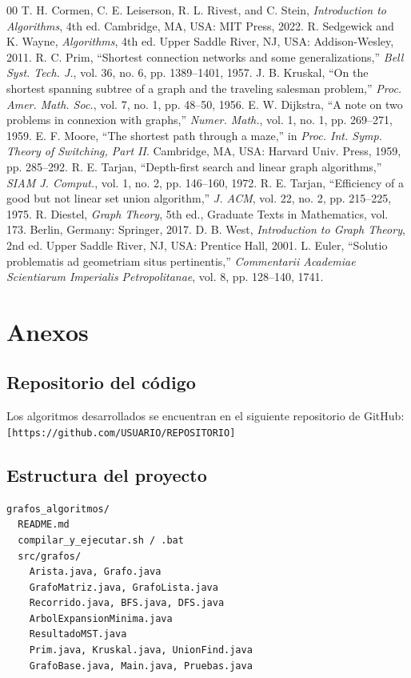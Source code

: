 \documentclass[conference]{IEEEtran}
\begin{document}
\begin{thebibliography}{00}
 T. H. Cormen, C. E. Leiserson, R. L. Rivest, and C. Stein, \emph{Introduction to Algorithms}, 4th ed. Cambridge, MA, USA: MIT Press, 2022.
 R. Sedgewick and K. Wayne, \emph{Algorithms}, 4th ed. Upper Saddle River, NJ, USA: Addison-Wesley, 2011.
 R. C. Prim, ``Shortest connection networks and some generalizations,'' \emph{Bell Syst. Tech. J.}, vol. 36, no. 6, pp. 1389--1401, 1957.
 J. B. Kruskal, ``On the shortest spanning subtree of a graph and the traveling salesman problem,'' \emph{Proc. Amer. Math. Soc.}, vol. 7, no. 1, pp. 48--50, 1956.
 E. W. Dijkstra, ``A note on two problems in connexion with graphs,'' \emph{Numer. Math.}, vol. 1, no. 1, pp. 269--271, 1959.
 E. F. Moore, ``The shortest path through a maze,'' in \emph{Proc. Int. Symp. Theory of Switching, Part II}. Cambridge, MA, USA: Harvard Univ. Press, 1959, pp. 285--292.
 R. E. Tarjan, ``Depth-first search and linear graph algorithms,'' \emph{SIAM J. Comput.}, vol. 1, no. 2, pp. 146--160, 1972.
 R. E. Tarjan, ``Efficiency of a good but not linear set union algorithm,'' \emph{J. ACM}, vol. 22, no. 2, pp. 215--225, 1975.
 R. Diestel, \emph{Graph Theory}, 5th ed., Graduate Texts in Mathematics, vol. 173. Berlin, Germany: Springer, 2017.
 D. B. West, \emph{Introduction to Graph Theory}, 2nd ed. Upper Saddle River, NJ, USA: Prentice Hall, 2001.
 L. Euler, ``Solutio problematis ad geometriam situs pertinentis,'' \emph{Commentarii Academiae Scientiarum Imperialis Petropolitanae}, vol. 8, pp. 128--140, 1741.
\end{thebibliography}

\section{Anexos}
\subsection{Repositorio del código}
Los algoritmos desarrollados se encuentran en el siguiente repositorio de GitHub:\\\n\texttt{[https://github.com/USUARIO/REPOSITORIO]}

\subsection{Estructura del proyecto}
\begin{lstlisting}[language={},numbers=none,xleftmargin=0pt,frame=single,basicstyle=\ttfamily\tiny]
grafos_algoritmos/
  README.md
  compilar_y_ejecutar.sh / .bat
  src/grafos/
    Arista.java, Grafo.java
    GrafoMatriz.java, GrafoLista.java
    Recorrido.java, BFS.java, DFS.java
    ArbolExpansionMinima.java
    ResultadoMST.java
    Prim.java, Kruskal.java, UnionFind.java
    GrafoBase.java, Main.java, Pruebas.java
\end{lstlisting}
\end{document}
